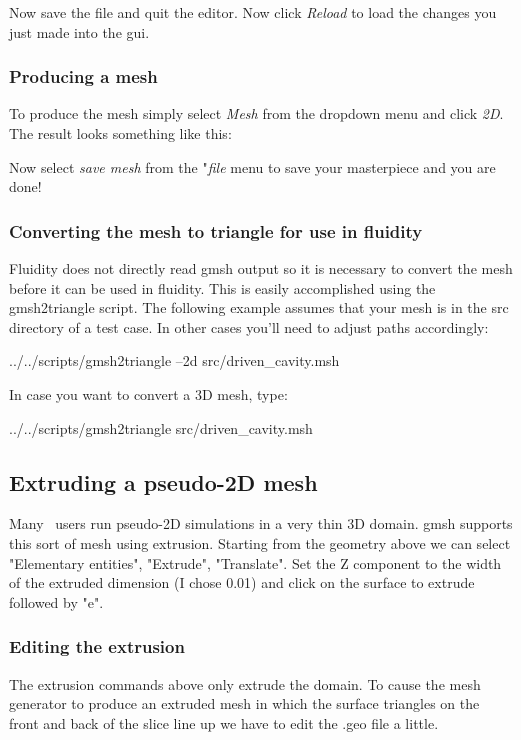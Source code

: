 Now save the file and quit the editor. Now click \textit{Reload} to load the changes you just made into the gui. 

\subsubsection{Producing a mesh}

To produce the mesh simply select \textit{Mesh} from the dropdown menu and click \textit{2D}. The result looks something like this:


Now select \textit{save mesh} from the "\textit{file} menu to save your masterpiece and you are done!

\subsubsection{Converting the mesh to triangle for use in fluidity}

Fluidity does not directly read gmsh output so it is necessary to convert the mesh before it can be used in fluidity. This is easily accomplished using the gmsh2triangle script. The following example assumes that your mesh is in the src directory of a test case. In other cases you'll need to adjust paths accordingly:

 ../../scripts/gmsh2triangle --2d src/driven\_cavity.msh

In case you want to convert a 3D mesh, type:

 ../../scripts/gmsh2triangle src/driven\_cavity.msh

\subsection{Extruding a pseudo-2D mesh}

Many \fluidity\ users run pseudo-2D simulations in a very thin 3D domain.
gmsh supports this sort of mesh using extrusion. Starting from the geometry
above we can select "Elementary entities", "Extrude", "Translate". Set the Z
component to the width of the extruded dimension (I chose 0.01) and click on
the surface to extrude followed by "e".

\subsubsection{Editing the extrusion}

The extrusion commands above only extrude the domain. To cause the mesh
generator to produce an extruded mesh in which the surface triangles on the
front and back of the slice line up we have to edit the .geo file a little.

